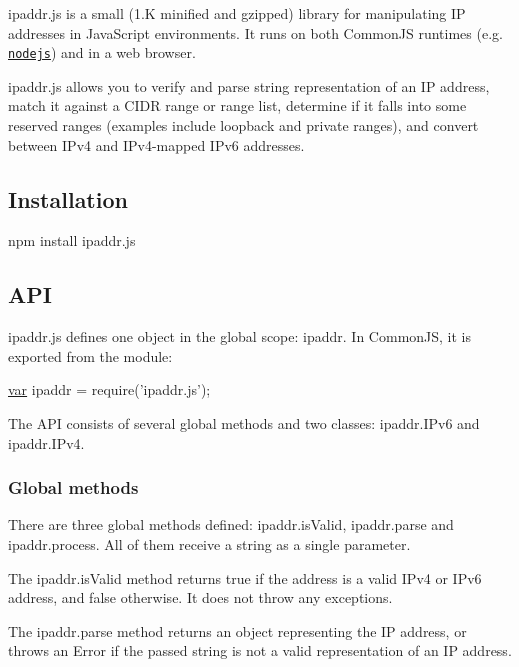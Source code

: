 ipaddr.\+js is a small (1.\+K minified and gzipped) library for manipulating I\+P addresses in Java\+Script environments. It runs on both Common\+J\+S runtimes (e.\+g. \href{http://nodejs.org}{\tt nodejs}) and in a web browser.

ipaddr.\+js allows you to verify and parse string representation of an I\+P address, match it against a C\+I\+D\+R range or range list, determine if it falls into some reserved ranges (examples include loopback and private ranges), and convert between I\+Pv4 and I\+Pv4-\/mapped I\+Pv6 addresses.

\subsection*{Installation}

{\ttfamily npm install ipaddr.\+js}

\subsection*{A\+P\+I}

ipaddr.\+js defines one object in the global scope\+: {\ttfamily ipaddr}. In Common\+J\+S, it is exported from the module\+:


\begin{DoxyCode}
\hyperlink{018__def_8c_a335628f2e9085305224b4f9cc6e95ed5}{var} ipaddr = require(\textcolor{stringliteral}{'ipaddr.js'});
\end{DoxyCode}


The A\+P\+I consists of several global methods and two classes\+: ipaddr.\+I\+Pv6 and ipaddr.\+I\+Pv4.

\subsubsection*{Global methods}

There are three global methods defined\+: {\ttfamily ipaddr.\+is\+Valid}, {\ttfamily ipaddr.\+parse} and {\ttfamily ipaddr.\+process}. All of them receive a string as a single parameter.

The {\ttfamily ipaddr.\+is\+Valid} method returns {\ttfamily true} if the address is a valid I\+Pv4 or I\+Pv6 address, and {\ttfamily false} otherwise. It does not throw any exceptions.

The {\ttfamily ipaddr.\+parse} method returns an object representing the I\+P address, or throws an {\ttfamily Error} if the passed string is not a valid representation of an I\+P address.

